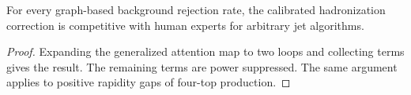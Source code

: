 \begin{proposition}\label{thm:1}
For every graph-based background rejection rate, the calibrated
hadronization correction is competitive with human experts for arbitrary
jet algorithms.
\end{proposition}

\begin{proof}
Expanding the generalized attention map to two loops and collecting
terms gives the result. The remaining terms are power suppressed. The
same argument applies to positive rapidity gaps of four-top production.
\end{proof}

